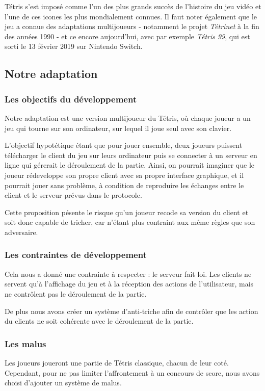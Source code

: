 \documentclass[a4paper, 12pt]{article}
\begin{document}
		Tétris s'est imposé comme l'un des plus grands succès de l'histoire du jeu vidéo et l'une de ces icones les plus mondialement connues. Il faut noter également que le jeu a connue des adaptations multijoueurs - notamment le projet \emph{Tétrinet} à la fin des années 1990 - et ce encore aujourd'hui, avec par exemple \emph{Tétris 99}, qui est sorti le 13 février 2019 sur Nintendo Switch.

	\subsection{Notre adaptation}
		\subsubsection{Les objectifs du développement}
			Notre adaptation est une version multijoueur du Tétris, où chaque joueur a un jeu qui tourne sur son ordinateur, sur lequel il joue seul avec son clavier. 

			L'objectif hypotétique étant que pour jouer ensemble, deux joueurs puissent télécharger le client du jeu sur leurs ordinateur puis se connecter à un serveur en ligne qui gérerait le déroulement de la partie. 
			Ainsi, on pourrait imaginer que le joueur rédeveloppe son propre client avec sa propre interface graphique, et il pourrait jouer sans problème, à condition de reproduire les échanges entre le client et le serveur prévus dans le protocole.

			Cette proposition pésente le risque qu'un joueur recode sa version du client et soit donc capable de tricher, car n'étant plus contraint aux même règles que son adversaire.

		\subsubsection{Les contraintes de développement}
			Cela nous a donné une contrainte à respecter : le serveur fait loi. Les clients ne servent qu'à l'affichage du jeu et à la réception des actions de l'utilisateur, mais ne contrôlent pas le déroulement de la partie.

			De plus nous avons créer un système d'anti-triche afin de contrôler que les action du clients ne soit cohérente avec le déroulement de la partie.

		\subsubsection{Les malus}
			Les joueurs joueront une partie de Tétris classique, chacun de leur coté. Cependant, pour ne pas limiter l'affrontement à un concours de score, nous avons choisi d'ajouter un système de malus.
\end{document}
